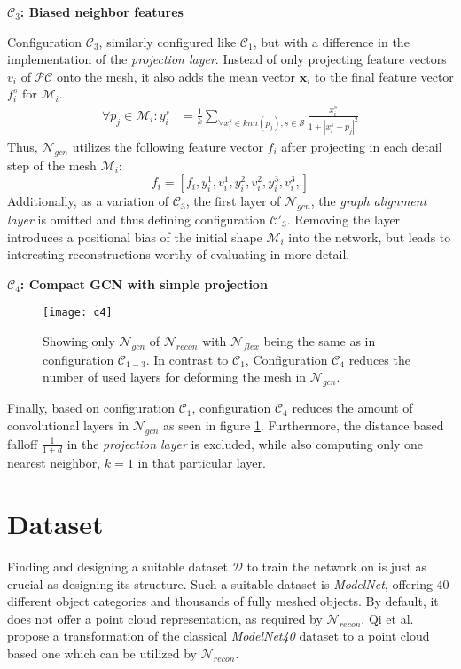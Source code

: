 \textbf{$\mathcal{C}_3$: Biased neighbor features}

Configuration $\mathcal{C}_3$, similarly configured like $\mathcal{C}_1$, but with a difference in the implementation of the \emph{projection layer}.
Instead of only projecting feature vectors $v_i$ of $\mathcal{PC}$ onto the mesh, it also adds the mean vector $\textbf{x}_i$ 
to the final feature vector $f_i^s$ for $\mathcal{M}_i$.
 \begin{align}
      \forall p_j \in \mathcal{M}_{i} : y_i^s &= \frac{1}{k}\sum_{\forall x_i^s \in knn(p_j),s\in \mathcal{S}} \frac{x_i^s}{1 + |x_i^s-p_j|^2}
   \end{align}
Thus, $\mathcal{N}_{gcn}$ utilizes the following feature vector $f_i$ after projecting in each detail step of the mesh $\mathcal{M}_i$:
\[f_i = [f_i, y_i^1, v_i^1, y_i^2, v_i^2,y_i^3, v_i^3,] \]
Additionally, as a variation of $\mathcal{C}_3$, the first layer of $\mathcal{N}_{gcn}$, the \emph{graph alignment layer} is omitted and 
thus defining configuration $\mathcal{C}'_3$. Removing the layer introduces a positional bias of the initial shape $\mathcal{M}_i$ into the network, but
leads to interesting reconstructions worthy of evaluating in more detail.

\textbf{$\mathcal{C}_4$: Compact GCN with simple projection}
\begin{figure}
   \begin{center}
   \texttt{[image: c4]}
   \caption{Showing only $\mathcal{N}_{gcn}$ of $\mathcal{N}_{recon}$ with $\mathcal{N}_{flex}$ being the same
    as in configuration $\mathcal{C}_{1-3}$. In contrast to $\mathcal{C}_1$, Configuration $\mathcal{C}_4$ reduces 
    the number of used layers for deforming the mesh in $\mathcal{N}_{gcn}$.}
   \label{fig:c4}
   \end{center}
\end{figure}
Finally, based on configuration $\mathcal{C}_1$, configuration $\mathcal{C}_4$ reduces the amount of convolutional layers in $\mathcal{N}_{gcn}$ as seen in figure \ref{fig:c4}.
Furthermore, the distance based falloff $\frac{1}{1+d}$ in the \emph{projection layer} is excluded, 
while also computing only one nearest neighbor, $k=1$ in that particular layer. 

\section{Dataset}
\label{dataset}
   Finding and designing a suitable dataset $\mathcal{D}$
   to train the network on is just as crucial as designing its structure. 
   Such a suitable dataset is \emph{ModelNet}, offering 40 different object 
   categories and thousands of fully meshed objects. By default, it does not offer a
   point cloud representation, as required by $\mathcal{N}_{recon}$. Qi et al.
   \cite{qi2017pointnetplusplus} propose a transformation of the classical \emph{ModelNet40}
   dataset to a point cloud based one which can be utilized by $\mathcal{N}_{recon}$.

